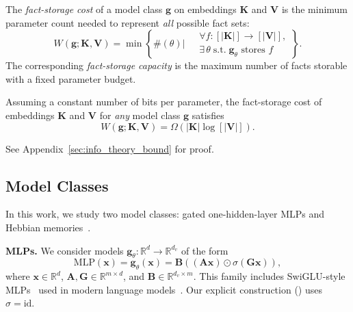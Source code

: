 \begin{definition}
\label{def:fact-storage-cost}
The \emph{fact-storage cost} of a model class $\mathbf{g}$ on embeddings $\mathbf{K}$ and $\mathbf{V}$ is the minimum parameter count needed to represent \emph{all} possible fact sets:
\begin{equation}
    W(\mathbf{g}; \mathbf{K}, \mathbf{V}) =
    \min \left\{\#(\theta)\Bigg|\;
    \begin{aligned}
        &\forall f : [|\mathbf{K}|] \to [|\mathbf{V}|], \\
        &\exists\, \theta \; \text{s.t.} \; \mathbf{g}_\theta \text{ stores } f
    \end{aligned}
    \right\}.
    \label{def:complexity}
\end{equation}
The corresponding \emph{fact-storage capacity} is the maximum number of facts storable with a fixed parameter budget.
\end{definition}

\begin{theorem}
\label{thm: info_bounds_capacity-const}
Assuming a constant number of bits per parameter, the fact-storage cost of embeddings $\mathbf{K}$ and $\mathbf{V}$ for \emph{any} model class $\mathbf{g}$ satisfies
\[
W(\mathbf{g}; \mathbf{K}, \mathbf{V}) = \Omega(|\mathbf{K}|\log [|\mathbf{V}|]).
\]
\end{theorem}
See Appendix~\ref{sec:info_theory_bound} for proof.


\subsection{Model Classes}
\label{subsec:model_classes}
In this work, we study two model classes: gated one-hidden-layer MLPs and Hebbian memories~\citep{10.1109/TC.1972.5008975, doi:10.1073/pnas.79.8.2554, bubeck2020networksizeweightssize, cabannes2024scalinglawsassociativememories, nichani2024understandingfactualrecalltransformers}.

\textbf{MLPs.} We consider models $\mathbf{g}_\theta:\mathbb{R}^d\to\mathbb{R}^{d_v}$ of the form
\begin{equation}
\label{eq:gated-mlp-class}
\text{MLP}(\mathbf{x}) =
\mathbf{g}_\theta(\mathbf{x})=\mathbf{B}\!\left((\mathbf{A}\mathbf{x})\odot \sigma(\mathbf{G}\mathbf{x})\right),
\end{equation}
where $\mathbf{x}\in\mathbb{R}^d$, $\mathbf{A},\mathbf{G}\in\mathbb{R}^{m\times d}$, and $\mathbf{B}\in\mathbb{R}^{d_{v}\times m}$.
This family includes SwiGLU-style MLPs~\citep{shazeer2020gluvariantsimprovetransformer} used in modern language models~\citep{yang2025qwen3technicalreport, deepseekai2025deepseekv3technicalreport, dubey2024llama}. Our explicit construction () uses $\sigma=\mathrm{id}$.

